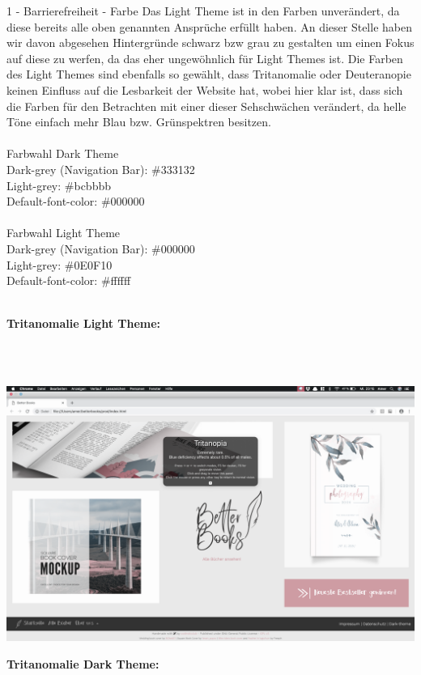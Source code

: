 \documentclass[a4paper]{article}
\begin{document}
\begin{exercise}{1 - Barrierefreiheit - Farbe}
Das Light Theme ist in den Farben unverändert, da diese bereits alle oben genannten Ansprüche erfüllt haben. An dieser Stelle haben wir davon abgesehen Hintergründe schwarz bzw grau zu gestalten um einen Fokus auf diese zu werfen, da das eher ungewöhnlich für Light Themes ist.
Die Farben des Light Themes sind ebenfalls so gewählt, dass Tritanomalie oder Deuteranopie keinen Einfluss auf die Lesbarkeit der Website hat, wobei hier klar ist, dass sich die Farben für den Betrachten mit einer dieser Sehschwächen verändert, da helle Töne einfach mehr Blau bzw. Grünspektren besitzen.\\\\
Farbwahl Dark Theme\\
Dark-grey (Navigation Bar): \#333132\\
Light-grey: \#bcbbbb\\
Default-font-color: \#000000 \\\\
Farbwahl Light Theme\\
Dark-grey (Navigation Bar): \#000000 \\
Light-grey: \#0E0F10\\
Default-font-color: \#ffffff\\\\
\newpage
\begin{Large}
\textbf{Tritanomalie Light Theme:}
\end{Large}\\\\
\begin{center}
 \includegraphics[scale=0.2]{../6_bookstore_main_tritanomalie_light.png}
 \end{center}
\begin{Large}
\textbf{Tritanomalie Dark Theme:}
\end{Large}\\\\

\end{exercise}
\end{document}
